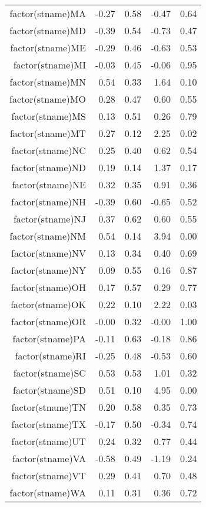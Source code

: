 \begin{table}[ht]
\begin{tabular}{rrrrr}
  factor(stname)MA & -0.27 & 0.58 & -0.47 & 0.64 \\ 
  factor(stname)MD & -0.39 & 0.54 & -0.73 & 0.47 \\ 
  factor(stname)ME & -0.29 & 0.46 & -0.63 & 0.53 \\ 
  factor(stname)MI & -0.03 & 0.45 & -0.06 & 0.95 \\ 
  factor(stname)MN & 0.54 & 0.33 & 1.64 & 0.10 \\ 
  factor(stname)MO & 0.28 & 0.47 & 0.60 & 0.55 \\ 
  factor(stname)MS & 0.13 & 0.51 & 0.26 & 0.79 \\ 
  factor(stname)MT & 0.27 & 0.12 & 2.25 & 0.02 \\ 
  factor(stname)NC & 0.25 & 0.40 & 0.62 & 0.54 \\ 
  factor(stname)ND & 0.19 & 0.14 & 1.37 & 0.17 \\ 
  factor(stname)NE & 0.32 & 0.35 & 0.91 & 0.36 \\ 
  factor(stname)NH & -0.39 & 0.60 & -0.65 & 0.52 \\ 
  factor(stname)NJ & 0.37 & 0.62 & 0.60 & 0.55 \\ 
  factor(stname)NM & 0.54 & 0.14 & 3.94 & 0.00 \\ 
  factor(stname)NV & 0.13 & 0.34 & 0.40 & 0.69 \\ 
  factor(stname)NY & 0.09 & 0.55 & 0.16 & 0.87 \\ 
  factor(stname)OH & 0.17 & 0.57 & 0.29 & 0.77 \\ 
  factor(stname)OK & 0.22 & 0.10 & 2.22 & 0.03 \\ 
  factor(stname)OR & -0.00 & 0.32 & -0.00 & 1.00 \\ 
  factor(stname)PA & -0.11 & 0.63 & -0.18 & 0.86 \\ 
  factor(stname)RI & -0.25 & 0.48 & -0.53 & 0.60 \\ 
  factor(stname)SC & 0.53 & 0.53 & 1.01 & 0.32 \\ 
  factor(stname)SD & 0.51 & 0.10 & 4.95 & 0.00 \\ 
  factor(stname)TN & 0.20 & 0.58 & 0.35 & 0.73 \\ 
  factor(stname)TX & -0.17 & 0.50 & -0.34 & 0.74 \\ 
  factor(stname)UT & 0.24 & 0.32 & 0.77 & 0.44 \\ 
  factor(stname)VA & -0.58 & 0.49 & -1.19 & 0.24 \\ 
  factor(stname)VT & 0.29 & 0.41 & 0.70 & 0.48 \\ 
  factor(stname)WA & 0.11 & 0.31 & 0.36 & 0.72 \\ 

\end{tabular}
\end{table}
